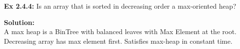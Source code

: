 \documentclass[11pt,fleqn]{article}
\begin{document}
\textbf{Ex 2.4.4:} Is an array that is sorted in decreasing order a max-oriented heap?
	
\textbf{Solution:}\\
A max heap is a BinTree with balanced leaves with Max Element at the root. Decreasing array has max element first. Satisfies max-heap in constant time.
\end{document}
